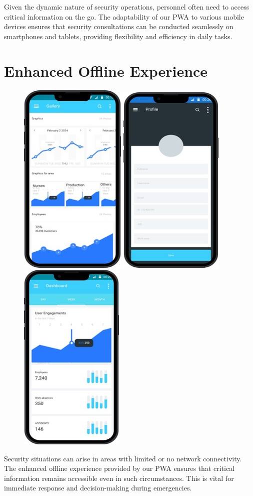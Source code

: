 \documentclass{article}
\begin{document}
	Given the dynamic nature of security operations, personnel often need to access critical information on the go. The adaptability of our PWA to various mobile devices ensures that security consultations can be conducted seamlessly on smartphones and tablets, providing flexibility and efficiency in daily tasks.
	

	\section{Enhanced Offline Experience}
	\begin{figure}[h]
		\centering
		\includegraphics[width=0.2\linewidth]{images/4.jpg}
		\hspace{0.05\linewidth}
		\includegraphics[width=0.2\linewidth]{images/5.jpg}
		\hspace{0.05\linewidth}
		\includegraphics[width=0.2\linewidth]{images/6.jpg}
	\end{figure}
	
	Security situations can arise in areas with limited or no network connectivity. The enhanced offline experience provided by our PWA ensures that critical information remains accessible even in such circumstances. This is vital for immediate response and decision-making during emergencies.
	
\end{document}
